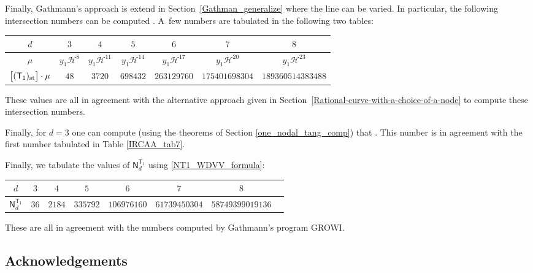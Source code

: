 \documentclass[pdftex]{sigma}
\numberwithin{equation}{section}
\begin{document}
Finally, Gathmann's approach is extend in Section~\ref{Gathman_generalize} where the line can be varied.
In particular, the following intersection numbers can be computed
.
A~few numbers are tabulated in the following two tables:
\begin{center}\renewcommand{\arraystretch}{1.2}
\begin{tabular}{|c|c|c|c|c|c|c|}
\hline
$d$ & $3$ & $4$ & $5$ & $6$ & $7$ & $8$ \\
\hline
$\mu$ & $y_1 \mathcal{H}^8$ & $y_1 \mathcal{H}^{11}$ & $y_1 \mathcal{H}^{14}$ & $y_1 \mathcal{H}^{17}$ &
$y_1\mathcal{H}^{20}$ & $y_1 \mathcal{H}^{23}$ \\
\hline
$\bigl[(\mathsf{T}_1)_{\textnormal{st}}\bigr] \cdot \mu$ & $48$ & $3720$ & $698432$ & $263129760$ & $175401698304$
& $189360514383488$ \\
\hline
\end{tabular}
 \label{IRCAA_tab7}
\end{center}
These values are all in agreement with the alternative approach given in Section~\ref{Rational-curve-with-a-choice-of-a-node}
to compute these intersection numbers.

Finally, for $d=3$ one can compute (using the theorems of Section \ref{one_nodal_tang_comp}) that
.
This number is in agreement with the first number tabulated in Table \ref{IRCAA_tab7}.

Finally, we tabulate the values of $\mathsf{N}_d^{\mathsf{T}_1}$ using \eqref{NT1_WDVV_formula}:
\begin{center}\renewcommand{\arraystretch}{1.2}
\begin{tabular}{|c|c|c|c|c|c|c|c|}
\hline
$d$& $3$ & $4$ & $5$ & $6$ & $7$ & $8$\\
\hline
$\mathsf{N}_d^{\mathsf{T}_1}$ & $36$ & $2184$ & $335792$ & $106976160$ & $61739450304$
& $58749399019136$\\
\hline
\end{tabular}
 \label{tab_NT1_WDVV}
\end{center}
These are all in agreement with the numbers computed by Gathmann's
program GROWI.



\subsection*{Acknowledgements}
\end{document}
